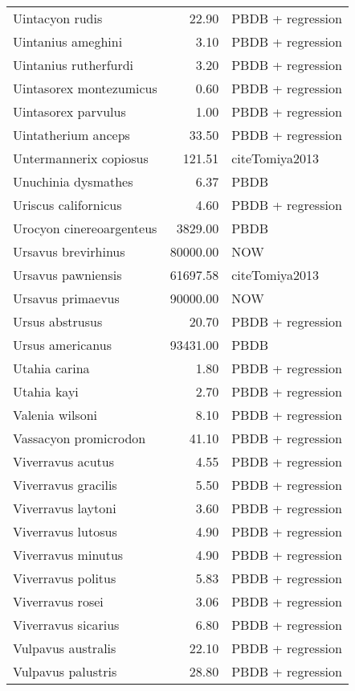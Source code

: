 \begin{table}[ht]
\begin{tabular}{lrl}
  Uintacyon rudis & 22.90 & PBDB + regression \\ 
  Uintanius ameghini & 3.10 & PBDB + regression \\ 
  Uintanius rutherfurdi & 3.20 & PBDB + regression \\ 
  Uintasorex montezumicus & 0.60 & PBDB + regression \\ 
  Uintasorex parvulus & 1.00 & PBDB + regression \\ 
  Uintatherium anceps & 33.50 & PBDB + regression \\ 
  Untermannerix copiosus & 121.51 & cite{Tomiya2013} \\ 
  Unuchinia dysmathes & 6.37 & PBDB \\ 
  Uriscus californicus & 4.60 & PBDB + regression \\ 
  Urocyon cinereoargenteus & 3829.00 & PBDB \\ 
  Ursavus brevirhinus & 80000.00 & NOW \\ 
  Ursavus pawniensis & 61697.58 & cite{Tomiya2013} \\ 
  Ursavus primaevus & 90000.00 & NOW \\ 
  Ursus abstrusus & 20.70 & PBDB + regression \\ 
  Ursus americanus & 93431.00 & PBDB \\ 
  Utahia carina & 1.80 & PBDB + regression \\ 
  Utahia kayi & 2.70 & PBDB + regression \\ 
  Valenia wilsoni & 8.10 & PBDB + regression \\ 
  Vassacyon promicrodon & 41.10 & PBDB + regression \\ 
  Viverravus acutus & 4.55 & PBDB + regression \\ 
  Viverravus gracilis & 5.50 & PBDB + regression \\ 
  Viverravus laytoni & 3.60 & PBDB + regression \\ 
  Viverravus lutosus & 4.90 & PBDB + regression \\ 
  Viverravus minutus & 4.90 & PBDB + regression \\ 
  Viverravus politus & 5.83 & PBDB + regression \\ 
  Viverravus rosei & 3.06 & PBDB + regression \\ 
  Viverravus sicarius & 6.80 & PBDB + regression \\ 
  Vulpavus australis & 22.10 & PBDB + regression \\ 
  Vulpavus palustris & 28.80 & PBDB + regression \\ 

\end{tabular}
\end{table}
